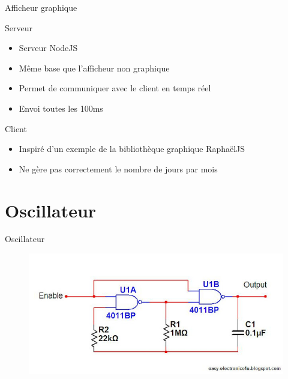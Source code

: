\documentclass{beamer}
\begin{document}
\begin{frame}{Afficheur graphique}
	\begin{block}{Serveur}
		\begin{itemize}
			\item Serveur NodeJS
			\item Même base que l'afficheur non graphique
			\item Permet de communiquer avec le client en temps réel
			\item Envoi toutes les 100ms
		\end{itemize}
	\end{block}
	
	\pause
	
	\begin{block}{Client}
		\begin{itemize}
			\item Inspiré d'un exemple de la bibliothèque graphique RaphaëlJS
			\item Ne gère pas correctement le nombre de jours par mois
		\end{itemize}
	\end{block}
\end{frame}



\section{Oscillateur}
\begin{frame}{Oscillateur}
	\begin{figure}
		\centering
		\includegraphics[width=\textwidth,height=0.9\textheight,keepaspectratio]{oscillator.jpg}
	\end{figure}
\end{frame}
\end{document}
